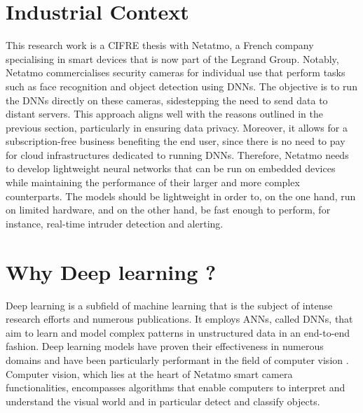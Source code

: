 \section{Industrial Context}


This research work is a CIFRE thesis with Netatmo, a French company specialising
in smart devices that is now part of the Legrand Group. Notably, Netatmo
commercialises security cameras for individual use that perform tasks such as
face recognition and object detection using \acp{DNN}. The objective is to run
the \acp{DNN} directly on these cameras, sidestepping the need to send data to
distant servers. This approach aligns well with the reasons outlined in the
previous section, particularly in ensuring data privacy. Moreover, it allows for
a subscription-free business benefiting the end user, since there is no need to
pay for cloud infrastructures dedicated to running \acp{DNN}. Therefore, Netatmo
needs to develop lightweight neural networks that can be run on embedded devices
while maintaining the performance of their larger and more complex counterparts.
The models should be lightweight in order to, on the one hand, run on limited
hardware, and on the other hand, be fast enough to perform, for instance,
real-time intruder detection and alerting.\\

\section{Why Deep learning ?}

Deep learning is a subfield of machine learning that is the subject of intense
research efforts and numerous publications. It employs \aclp{ANN}, called
\acfp{DNN}, that aim to learn and model complex patterns in unstructured data in
an end-to-end fashion. Deep learning models have proven their effectiveness in
numerous domains and have been particularly performant in the field of computer
vision
\cite{DBLP:conf/cvpr/HeZRS16,DBLP:conf/nips/RenHGS15,DBLP:conf/eccv/LiuAESRFB16}.
Computer vision, which lies at the heart of Netatmo smart camera
functionalities, encompasses algorithms that enable computers to interpret and
understand the visual world and in particular detect and classify objects.\\

